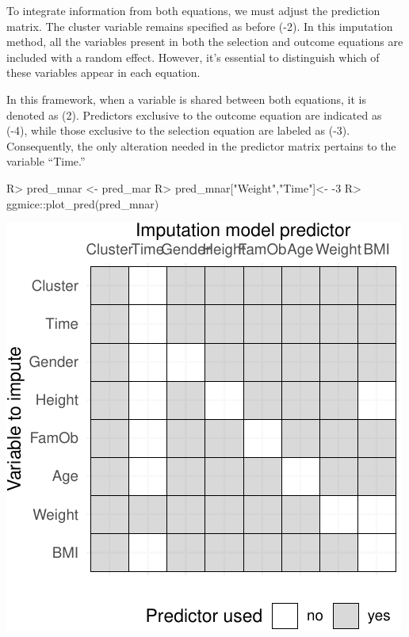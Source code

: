 \documentclass[
]{jss}
\begin{document}
To integrate information from both equations, we must adjust the
prediction matrix. The cluster variable remains specified as before
(-2). In this imputation method, all the variables present in both the
selection and outcome equations are included with a random effect.
However, it's essential to distinguish which of these variables appear
in each equation.

In this framework, when a variable is shared between both equations, it
is denoted as (2). Predictors exclusive to the outcome equation are
indicated as (-4), while those exclusive to the selection equation are
labeled as (-3). Consequently, the only alteration needed in the
predictor matrix pertains to the variable ``Time.''

\begin{CodeChunk}
\begin{CodeInput}
R> pred_mnar <- pred_mar
R> pred_mnar["Weight","Time"]<- -3
R> ggmice::plot_pred(pred_mnar)
\end{CodeInput}


\begin{center}\includegraphics{Imputation_of_Incomplete_Multilevel_Data_files/figure-latex/obsmnar_pred-1} \end{center}

\end{CodeChunk}
\end{document}
